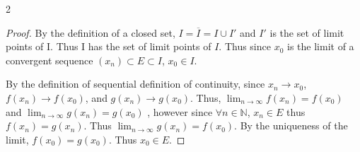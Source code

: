 \documentclass{article}
\newcommand{\N}{\mathbb{N}}
\begin{document}
\begin{PROB}{2}\label{Problem 2.}
\end{PROB}
\begin{proof}
    By the definition of a closed set, $I = \overline{I} = I \cup I'$ and $I'$ is the set of limit points of I. Thus I has the set of limit points of $I$. Thus since $x_0$ is the limit of a convergent sequence $(x_n) \subset E\subset I$, $x_0 \in I$. 
    
    By the definition of sequential definition of continuity, since $x_n \to x_0$, $f(x_n) \to f(x_0)$, and $g(x_n) \to g(x_0)$. Thus, $\lim_{n \to \infty} f(x_n) = f(x_0)$ and $\lim_{n \to \infty} g(x_n) = g(x_0)$ , however since $\forall n \in \N$, $x_n \in E$ thus $f(x_n) = g(x_n)$. Thus $\lim_{n \to \infty} g(x_n) = f(x_0)$. By the uniqueness of the limit, $f(x_0) = g(x_0)$. Thus $x_0 \in E$.              
\end{proof}

\bigskip
\end{document}
